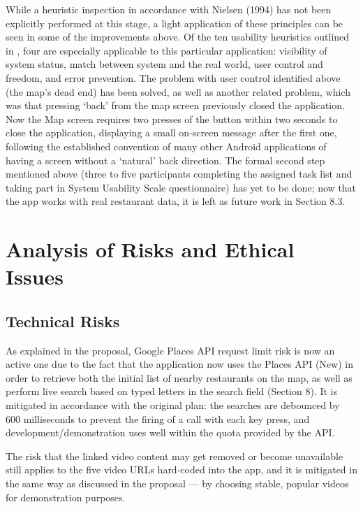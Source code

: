 \documentclass[12pt, a4paper]{article}
\begin{document}
While a heuristic inspection in accordance with Nielsen (1994) has not been explicitly performed at this stage, a light application of these principles can be seen in some of the improvements above. Of the ten usability heuristics outlined in \citet{nielsen1994}, four are especially applicable to this particular application: visibility of system status, match between system and the real world, user control and freedom, and error prevention. The problem with user control identified above (the map's dead end) has been solved, as well as another related problem, which was that pressing `back' from the map screen previously closed the application. Now the Map screen requires two presses of the button within two seconds to close the application, displaying a small on-screen message after the first one, following the established convention of many other Android applications of having a screen without a `natural' back direction. The formal second step mentioned above (three to five participants completing the assigned task list and taking part in System Usability Scale questionnaire) has yet to be done; now that the app works with real restaurant data, it is left as future work in Section 8.3.

\section{Analysis of Risks and Ethical Issues}

\subsection{Technical Risks}

As explained in the proposal, Google Places API request limit risk is now an active one due to the fact that the application now uses the Places API (New) in order to retrieve both the initial list of nearby restaurants on the map, as well as perform live search based on typed letters in the search field (Section 8). It is mitigated in accordance with the original plan: the searches are debounced by 600 milliseconds to prevent the firing of a call with each key press, and development/demonstration uses well within the quota provided by the API.

The risk that the linked video content may get removed or become unavailable still applies to the five video URLs hard-coded into the app, and it is mitigated in the same way as discussed in the proposal --- by choosing stable, popular videos for demonstration purposes.
\end{document}
